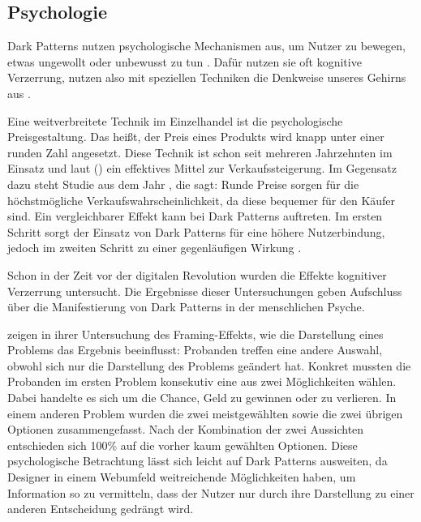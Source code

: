 \documentclass[conference,compsoc,final,a4paper]{IEEEtran}
\begin{document}
\subsection{Psychologie}
\label{chap:Psychologie}
Dark Patterns nutzen psychologische Mechanismen aus, um Nutzer zu bewegen, etwas ungewollt oder unbewusst zu tun \autocite{Brignull}. Dafür nutzen sie oft kognitive Verzerrung, nutzen also mit speziellen Techniken die Denkweise unseres Gehirns aus \autocite{Mathur2019}.

Eine weitverbreitete Technik im Einzelhandel ist die psychologische Preisgestaltung. Das heißt, der Preis eines Produkts wird knapp unter einer runden Zahl angesetzt. Diese Technik ist schon seit mehreren Jahrzehnten im Einsatz und laut \citeauthor{Bizer_2005} () \autocite{Bizer_2005} ein effektives Mittel zur Verkaufssteigerung. Im Gegensatz dazu steht \citeauthor{Wieseke_2015} \autocite{Wieseke_2015} Studie aus dem Jahr , die sagt: Runde Preise sorgen für die höchstmögliche Verkaufswahrscheinlichkeit, da diese bequemer für den Käufer sind. Ein vergleichbarer Effekt kann bei Dark Patterns auftreten. Im ersten Schritt sorgt der Einsatz von Dark Patterns für eine höhere Nutzerbindung, jedoch im zweiten Schritt zu einer gegenläufigen Wirkung \autocite{M.Bhoot2020}.

Schon in der Zeit vor der digitalen Revolution wurden die Effekte kognitiver Verzerrung untersucht. Die Ergebnisse dieser Untersuchungen geben Aufschluss über die Manifestierung von Dark Patterns in der menschlichen Psyche.

\citeauthor{Tversky453} \autocite{Tversky453} zeigen in ihrer Untersuchung des Framing-Effekts, wie die Darstellung eines Problems das Ergebnis beeinflusst: Probanden treffen eine andere Auswahl, obwohl sich nur die Darstellung des Problems geändert hat. Konkret mussten die Probanden im ersten Problem konsekutiv eine aus zwei Möglichkeiten wählen. Dabei handelte es sich um die Chance, Geld zu gewinnen oder zu verlieren. In einem anderen Problem wurden die zwei meistgewählten sowie die zwei übrigen Optionen zusammengefasst. Nach der Kombination der zwei Aussichten entschieden sich 100\% auf die vorher kaum gewählten Optionen. Diese psychologische Betrachtung lässt sich leicht auf Dark Patterns ausweiten, da Designer in einem Webumfeld weitreichende Möglichkeiten haben, um Information so zu vermitteln, dass der Nutzer nur durch ihre Darstellung zu einer anderen Entscheidung gedrängt wird.
\end{document}
